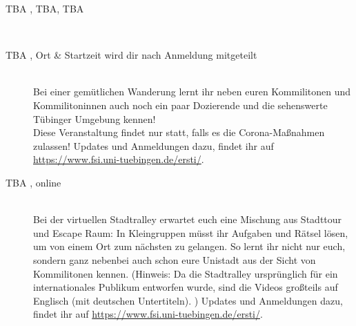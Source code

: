 \begin{description}
\ifml
    \item[TBA \YEAR, TBA, TBA]\ \\
\else
    \item[TBA \YEAR, \footnotesize{Ort \& Startzeit wird dir nach Anmeldung mitgeteilt}]\ \\
        Bei einer gemütlichen Wanderung lernt ihr neben euren Kommilitonen und Kommilitoninnen auch noch ein paar Dozierende und die sehenswerte Tübinger Umgebung kennen!\\ 
        Diese Veranstaltung findet nur statt, falls es die Corona-Maßnahmen zulassen! Updates und Anmeldungen dazu, findet ihr auf \url{https://www.fsi.uni-tuebingen.de/ersti/}.
\fi

\ifml
\else
    \item[TBA \YEAR, online]\ \\
    Bei der virtuellen Stadtralley erwartet euch eine Mischung aus Stadttour und Escape Raum: In Kleingruppen müsst ihr Aufgaben und Rätsel lösen, um von einem Ort zum nächsten zu gelangen. So lernt ihr nicht nur euch, sondern ganz nebenbei auch schon eure Unistadt aus der Sicht von Kommilitonen kennen. 
    (Hinweis: Da die Stadtralley ursprünglich für ein internationales Publikum entworfen wurde, sind die Videos großteils auf Englisch (mit deutschen Untertiteln). )
    Updates und Anmeldungen dazu, findet ihr auf \url{https://www.fsi.uni-tuebingen.de/ersti/}.
\fi



\end{description}
